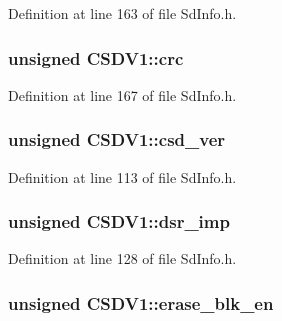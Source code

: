 Definition at line 163 of file Sd\+Info.\+h.

\subsubsection[{\texorpdfstring{crc}{crc}}]{\setlength{\rightskip}{0pt plus 5cm}unsigned C\+S\+D\+V1\+::crc}\hypertarget{struct_c_s_d_v1_a2d5f23ba505a0a139bdc685bd50c2ef1}{}\label{struct_c_s_d_v1_a2d5f23ba505a0a139bdc685bd50c2ef1}


Definition at line 167 of file Sd\+Info.\+h.

\subsubsection[{\texorpdfstring{csd\+\_\+ver}{csd\_ver}}]{\setlength{\rightskip}{0pt plus 5cm}unsigned C\+S\+D\+V1\+::csd\+\_\+ver}\hypertarget{struct_c_s_d_v1_a1bfd31c79faed95a073e55fba80cd21c}{}\label{struct_c_s_d_v1_a1bfd31c79faed95a073e55fba80cd21c}


Definition at line 113 of file Sd\+Info.\+h.

\subsubsection[{\texorpdfstring{dsr\+\_\+imp}{dsr\_imp}}]{\setlength{\rightskip}{0pt plus 5cm}unsigned C\+S\+D\+V1\+::dsr\+\_\+imp}\hypertarget{struct_c_s_d_v1_ada54dc8c3d5ffc12b20160ae241fa623}{}\label{struct_c_s_d_v1_ada54dc8c3d5ffc12b20160ae241fa623}


Definition at line 128 of file Sd\+Info.\+h.

\subsubsection[{\texorpdfstring{erase\+\_\+blk\+\_\+en}{erase\_blk\_en}}]{\setlength{\rightskip}{0pt plus 5cm}unsigned C\+S\+D\+V1\+::erase\+\_\+blk\+\_\+en}\hypertarget{struct_c_s_d_v1_ac15904615b375a2a4a6644fbeb9cc493}{}\label{struct_c_s_d_v1_ac15904615b375a2a4a6644fbeb9cc493}


